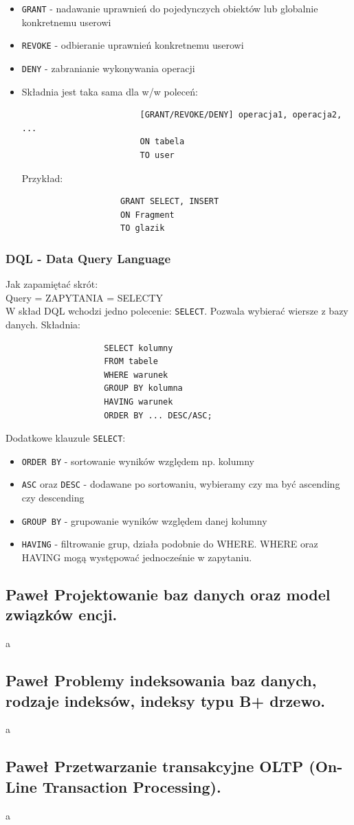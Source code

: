 \documentclass[a4paper,12pt,oneside]{book}
\begin{document}
				\begin{itemize}
					\item \verb*|GRANT| - nadawanie uprawnień do pojedynczych obiektów lub globalnie konkretnemu userowi
					\item \verb*|REVOKE| - odbieranie uprawnień konkretnemu userowi
					\item \verb*|DENY| - zabranianie wykonywania operacji
					\item Składnia jest taka sama dla w/w poleceń:
					\begin{verbatim}
						[GRANT/REVOKE/DENY] operacja1, operacja2, ...
						ON tabela
						TO user
					\end{verbatim}
					Przykład:
					\begin{verbatim}
					GRANT SELECT, INSERT
					ON Fragment
					TO glazik
					\end{verbatim}
				\end{itemize}
				
				\subsubsection{DQL - Data Query Language}
				\noindent Jak zapamiętać skrót: \\ Query = ZAPYTANIA = SELECTY \\
				\noindent W skład DQL wchodzi jedno polecenie: \verb*|SELECT|. Pozwala wybierać wiersze z bazy danych. Składnia:
				\begin{verbatim}
					SELECT kolumny 
					FROM tabele 
					WHERE warunek
					GROUP BY kolumna
					HAVING warunek
					ORDER BY ... DESC/ASC;
				\end{verbatim}
				Dodatkowe klauzule \verb*|SELECT|:
				\begin{itemize}
					\itemsep 0em
					\item \verb*|ORDER BY| - sortowanie wyników względem np. kolumny
					\item \verb*|ASC| oraz \verb*|DESC| - dodawane po sortowaniu, wybieramy czy ma być ascending czy descending
					\item \verb*|GROUP BY| - grupowanie wyników względem danej kolumny
					\item \verb*|HAVING| - filtrowanie grup, działa podobnie do WHERE. WHERE oraz HAVING mogą występować jednocześnie w zapytaniu.
				\end{itemize}
				
			\newpage\subsection{\color{green} Paweł \color{red}Projektowanie baz danych oraz model związków encji.}
				a
			\newpage\subsection{\color{green} Paweł \color{red}Problemy indeksowania baz danych, rodzaje indeksów, indeksy typu B+ drzewo.}
				a
			\newpage\subsection{\color{green} Paweł \color{red}Przetwarzanie transakcyjne OLTP (On-Line Transaction Processing).}
				a
		
\end{document}
